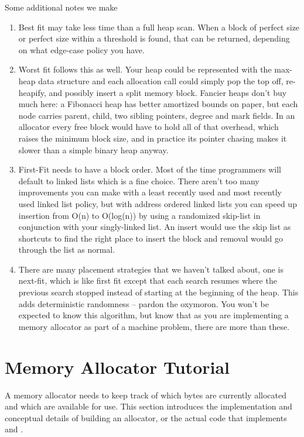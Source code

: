 Some additional notes we make

\begin{enumerate}
\item Best fit may take less time than a full heap scan. When a block of perfect size or perfect size within a threshold is found, that can be returned, depending on what edge-case policy you have.
\item Worst fit follows this as well. Your heap could be represented with the max-heap data structure and each allocation call could simply pop the top off, re-heapify, and possibly insert a split memory block.
  Fancier heaps don't buy much here: a Fibonacci heap has better amortized bounds on paper, but each node carries parent, child, two sibling pointers, degree and mark fields.
  In an allocator every free block would have to hold all of that overhead, which raises the minimum block size, and in practice its pointer chasing makes it slower than a simple binary heap anyway.
\item First-Fit needs to have a block order. Most of the time programmers will default to linked lists which is a fine choice. There aren't too many improvements you can make with a least recently used and most recently used linked list policy, but with address ordered linked lists you can speed up insertion from O(n) to O(log(n)) by using a randomized skip-list in conjunction with your singly-linked list.
  An insert would use the skip list as shortcuts to find the right place to insert the block and removal would go through the list as normal.
\item There are many placement strategies that we haven't talked about, one is next-fit, which is like first fit except that each search resumes where the previous search stopped instead of starting at the beginning of the heap. This adds deterministic randomness -- pardon the oxymoron. You won't be expected to know this algorithm, but know that as you are implementing a memory allocator as part of a machine problem, there are more than these.
  \end{enumerate}

\section{Memory Allocator Tutorial}

A memory allocator needs to keep track of which bytes are currently allocated and which are available for use.
This section introduces the implementation and conceptual details of building an allocator, or the actual code that implements  and .

